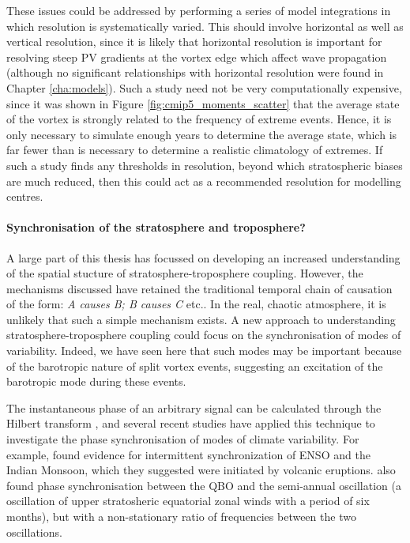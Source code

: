 These issues could be addressed by performing a series of model integrations in
which resolution is systematically varied. This should involve horizontal as
well as vertical resolution, since it is likely that horizontal resolution is
important for resolving steep PV gradients at the vortex edge which affect wave
propagation (although no significant relationships with horizontal resolution
were found in Chapter \ref{cha:models}). Such a study need not be very
computationally expensive, since it was shown in Figure
\ref{fig:cmip5_moments_scatter} that the average state of the vortex is strongly
related to the frequency of extreme events. Hence, it is only necessary to
simulate enough years to determine the average state, which is far fewer than is
necessary to determine a realistic climatology of extremes. If such a study
finds any thresholds in resolution, beyond which stratospheric biases are much
reduced, then this could act as a recommended resolution for modelling centres.


\paragraph{Synchronisation of the stratosphere and troposphere?} A large part of
this thesis has focussed on developing an increased understanding of the spatial
stucture of stratosphere-troposphere coupling. However, the mechanisms discussed
have retained the traditional temporal chain of causation of the form: \emph{A
  causes B; B causes C} etc.. In the real, chaotic atmosphere, it is unlikely
that such a simple mechanism exists. A new approach to understanding
stratosphere-troposphere coupling could focus on the synchronisation of modes of
variability. Indeed, we have seen here that such modes may be important because
of the barotropic nature of split vortex events, suggesting an excitation of the
barotropic mode during these events.

The instantaneous phase of an arbitrary signal can be calculated through the
Hilbert transform \citep{Pikovsky2001}, and several recent studies have applied
this technique to investigate the phase synchronisation of modes of climate
variability. For example, \citet{Maraun2005} found evidence for intermittent
synchronization of ENSO and the Indian Monsoon, which they suggested were
initiated by volcanic eruptions. \citet{Read2012} also found phase
synchronisation between the QBO and the semi-annual oscillation (a oscillation
of upper stratosheric equatorial zonal winds with a period of six months), but
with a non-stationary ratio of frequencies between the two oscillations.

